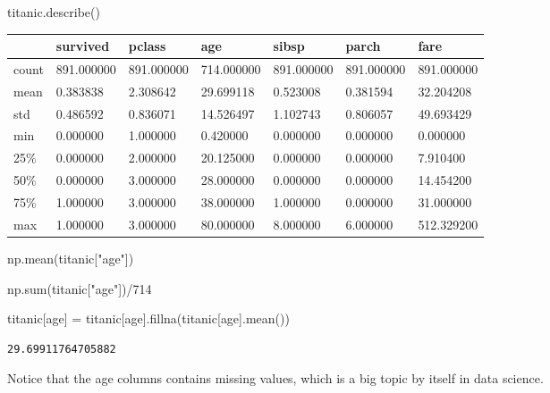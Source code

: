 \documentclass[
  letterpaper,
  DIV=11,
  numbers=noendperiod]{scrreprt}
\newenvironment{Shaded}{\begin{snugshade}}{\end{snugshade}}
\newcommand{\BuiltInTok}[1]{\textcolor[rgb]{0.00,0.23,0.31}{#1}}
\newcommand{\DecValTok}[1]{\textcolor[rgb]{0.68,0.00,0.00}{#1}}
\newcommand{\NormalTok}[1]{\textcolor[rgb]{0.00,0.23,0.31}{#1}}
\newcommand{\OperatorTok}[1]{\textcolor[rgb]{0.37,0.37,0.37}{#1}}
\newcommand{\StringTok}[1]{\textcolor[rgb]{0.13,0.47,0.30}{#1}}
\begin{document}
\begin{Shaded}
\begin{Highlighting}[]
\NormalTok{titanic.describe()}
\end{Highlighting}
\end{Shaded}

\begin{longtable}[]{@{}lllllll@{}}
\toprule()
& survived & pclass & age & sibsp & parch & fare \\
\midrule()
\endhead
count & 891.000000 & 891.000000 & 714.000000 & 891.000000 & 891.000000 &
891.000000 \\
mean & 0.383838 & 2.308642 & 29.699118 & 0.523008 & 0.381594 &
32.204208 \\
std & 0.486592 & 0.836071 & 14.526497 & 1.102743 & 0.806057 &
49.693429 \\
min & 0.000000 & 1.000000 & 0.420000 & 0.000000 & 0.000000 & 0.000000 \\
25\% & 0.000000 & 2.000000 & 20.125000 & 0.000000 & 0.000000 &
7.910400 \\
50\% & 0.000000 & 3.000000 & 28.000000 & 0.000000 & 0.000000 &
14.454200 \\
75\% & 1.000000 & 3.000000 & 38.000000 & 1.000000 & 0.000000 &
31.000000 \\
max & 1.000000 & 3.000000 & 80.000000 & 8.000000 & 6.000000 &
512.329200 \\
\bottomrule()
\end{longtable}

\begin{Shaded}
\begin{Highlighting}[]
\NormalTok{np.mean(titanic[}\StringTok{"age"}\NormalTok{])}

\NormalTok{np.}\BuiltInTok{sum}\NormalTok{(titanic[}\StringTok{"age"}\NormalTok{])}\OperatorTok{/}\DecValTok{714}

\NormalTok{titanic[}\StringTok{\textquotesingle{}age\textquotesingle{}}\NormalTok{] }\OperatorTok{=}\NormalTok{ titanic[}\StringTok{\textquotesingle{}age\textquotesingle{}}\NormalTok{].fillna(titanic[}\StringTok{\textquotesingle{}age\textquotesingle{}}\NormalTok{].mean())}
\end{Highlighting}
\end{Shaded}

\begin{verbatim}
29.69911764705882
\end{verbatim}

Notice that the age columns contains missing values, which is a big
topic by itself in data science.
\end{document}
